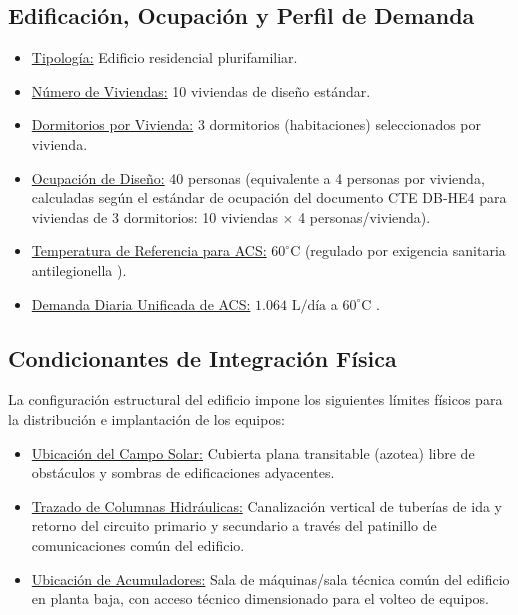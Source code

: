 \documentclass[12pt]{article}
\begin{document}
\subsection{Edificación, Ocupación y Perfil de Demanda}
\label{subsec:edificacion_ocupacion_demanda}

\begin{itemize}
    \item \uline{Tipología:} Edificio residencial plurifamiliar.
    \item \uline{Número de Viviendas:} 10 viviendas de diseño estándar.
    \item \uline{Dormitorios por Vivienda:} 3 dormitorios (habitaciones) seleccionados por vivienda.
    \item \uline{Ocupación de Diseño:} 40 personas (equivalente a 4 personas por vivienda, calculadas según el estándar de ocupación del documento CTE DB-HE4 \cite{cte_he4} para viviendas de 3 dormitorios: 10 viviendas $\times$ 4 personas/vivienda).
    \item \uline{Temperatura de Referencia para ACS:} $60^\circ\text{C}$ (regulado por exigencia sanitaria antilegionella \cite{rd487_2022}).
    \item \uline{Demanda Diaria Unificada de ACS:} $1.064 \text{ L/día}$ a $60^\circ\text{C}$ \cite{cte_he4}.
\end{itemize}

\subsection{Condicionantes de Integración Física}
\label{subsec:condicionantes_integracion}

La configuración estructural del edificio impone los siguientes límites físicos para la distribución e implantación de los equipos:
\begin{itemize}
    \item \uline{Ubicación del Campo Solar:} Cubierta plana transitable (azotea) libre de obstáculos y sombras de edificaciones adyacentes.
    \item \uline{Trazado de Columnas Hidráulicas:} Canalización vertical de tuberías de ida y retorno del circuito primario y secundario a través del patinillo de comunicaciones común del edificio.
    \item \uline{Ubicación de Acumuladores:} Sala de máquinas/sala técnica común del edificio en planta baja, con acceso técnico dimensionado para el volteo de equipos.
\end{itemize}
\end{document}
